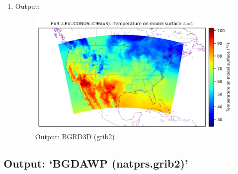 \documentclass[11pt,fleqn]{report}              %
\begin{document}
\begin{enumerate}
\item Output:

\begin{figure}[ht!]
  \centering
  \includegraphics[width=0.8\linewidth]{fv3_out_lev_CONUS_C96_t_hybrid_L001.png}
  \caption{Output: BGRD3D (grib2)}
  \label{fig:py_out_lev}
\end{figure}

\end{enumerate}



\subsection{Output: `BGDAWP (natprs.grib2)'}
\label{subsec:python_BGDAWP}
\end{document}
